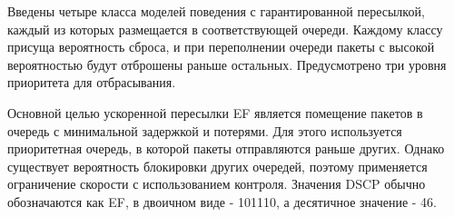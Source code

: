 Введены четыре класса моделей поведения с гарантированной пересылкой, каждый из которых размещается в соответствующей очереди. Каждому классу присуща вероятность сброса, и при переполнении очереди пакеты с высокой вероятностью будут отброшены раньше остальных. Предусмотрено три уровня приоритета для отбрасывания.

Основной целью ускоренной пересылки EF является помещение пакетов в очередь с минимальной задержкой и потерями. Для этого используется приоритетная очередь, в которой пакеты отправляются раньше других. Однако существует вероятность блокировки других очередей, поэтому применяется ограничение скорости с использованием контроля. Значения DSCP\cite{dscp-value} обычно обозначаются как EF, в двоичном виде - 101110, а десятичное значение - 46.
%

%

